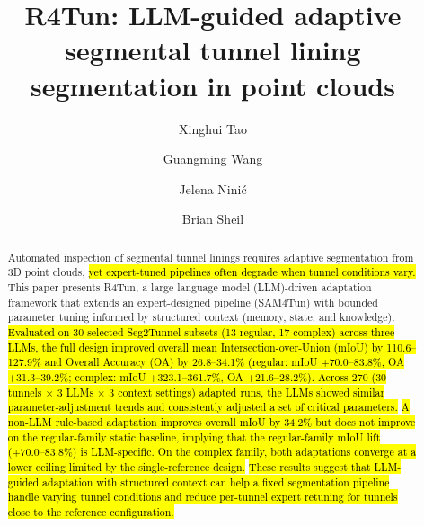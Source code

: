\documentclass[a4paper,fleqn]{cas-dc}
\begin{document}
\let\WriteBookmarks\relax
\def\floatpagepagefraction{1}
\def\textpagefraction{.001}


{

\title[mode=title]{R4Tun: LLM-guided adaptive segmental tunnel lining segmentation in point clouds}

\author[1]{Xinghui Tao}

\author[1]{Guangming Wang}
\cormark[1]

\author[2]{Jelena Nini\'{c}}

\author[1]{Brian Sheil}





\begin{abstract}
Automated inspection of segmental tunnel linings requires adaptive segmentation from 3D point clouds, \hl{yet expert-tuned pipelines often degrade when tunnel conditions vary.} This paper presents R4Tun, a large language model (LLM)-driven adaptation framework that extends an expert-designed pipeline (SAM4Tun) with bounded parameter tuning informed by structured context (memory, state, and knowledge). \hl{Evaluated on 30 selected Seg2Tunnel subsets (13 regular, 17 complex) across three LLMs, the full design improved overall mean Intersection-over-Union (mIoU) by 110.6--127.9\% and Overall Accuracy (OA) by 26.8--34.1\% (regular: mIoU +70.0--83.8\%, OA +31.3--39.2\%; complex: mIoU +323.1--361.7\%, OA +21.6--28.2\%). Across 270 (30 tunnels $\times$ 3 LLMs $\times$ 3 context settings) adapted runs, the LLMs showed similar parameter-adjustment trends and consistently adjusted a set of critical parameters.} \hl{A non-LLM rule-based adaptation improves overall mIoU by 34.2\% but does not improve on the regular-family static baseline, implying that the regular-family mIoU lift (+70.0--83.8\%) is LLM-specific. On the complex family, both adaptations converge at a lower ceiling limited by the single-reference design.} \hl{These results suggest that LLM-guided adaptation with structured context can help a fixed segmentation pipeline handle varying tunnel conditions and reduce per-tunnel expert retuning for tunnels close to the reference configuration.}
\end{abstract}


}
\end{document}
